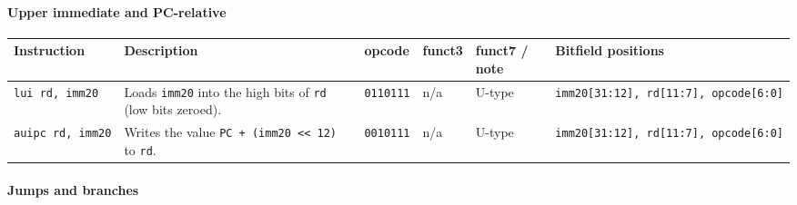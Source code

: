 \documentclass[]{article}
\let\oldparagraph\paragraph
\renewcommand{\paragraph}[1]{\oldparagraph{#1}\mbox{}}
\begin{document}
\hypertarget{upper-immediate-and-pc-relative}{%
\paragraph{Upper immediate and
PC-relative}\label{upper-immediate-and-pc-relative}}

\begin{longtable}[]{@{}llllll@{}}
\toprule
Instruction & Description & opcode & funct3 & funct7 / note & Bitfield
positions\tabularnewline
\midrule
\endhead
\texttt{lui\ rd,\ imm20} & Loads \texttt{imm20} into the high bits of
\texttt{rd} (low bits zeroed). & \texttt{0110111} & n/a & U-type &
\texttt{imm20{[}31:12{]},\ rd{[}11:7{]},\ opcode{[}6:0{]}}\tabularnewline
\texttt{auipc\ rd,\ imm20} & Writes the value
\texttt{PC\ +\ (imm20\ \textless{}\textless{}\ 12)} to \texttt{rd}. &
\texttt{0010111} & n/a & U-type &
\texttt{imm20{[}31:12{]},\ rd{[}11:7{]},\ opcode{[}6:0{]}}\tabularnewline
\bottomrule
\end{longtable}

\hypertarget{jumps-and-branches}{%
\paragraph{Jumps and branches}\label{jumps-and-branches}}
\end{document}
